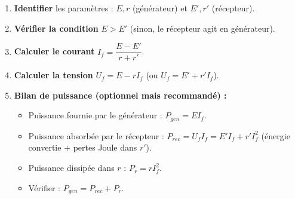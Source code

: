 \documentclass[11pt]{article}
\begin{document}
\begin{methode}
\begin{enumerate}
\item \textbf{Identifier} les paramètres : $E, r$ (générateur) et $E', r'$ (récepteur).
\item \textbf{Vérifier la condition} $E > E'$ (sinon, le récepteur agit en générateur).
\item \textbf{Calculer le courant} $I_f = \dfrac{E - E'}{r + r'}$.
\item \textbf{Calculer la tension} $U_f = E - r I_f$ (ou $U_f = E' + r' I_f$).
\item \textbf{Bilan de puissance (optionnel mais recommandé) :}
\begin{itemize}
\item Puissance fournie par le générateur : $P_{gen} = E I_f$.
\item Puissance absorbée par le récepteur : $P_{rec} = U_f I_f = E' I_f + r' I_f^2$ (énergie convertie + pertes Joule dans $r'$).
\item Puissance dissipée dans $r$ : $P_r = r I_f^2$.
\item Vérifier : $P_{gen} = P_{rec} + P_r$.
\end{itemize}
\end{enumerate}
\end{methode}
\end{document}
